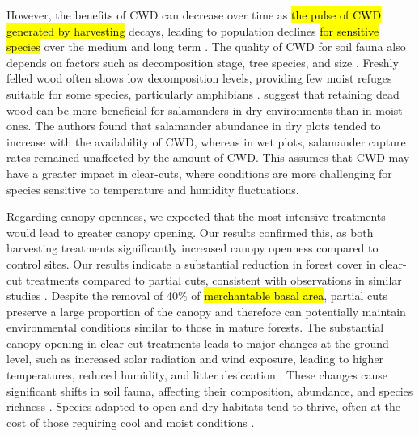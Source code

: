 However, the benefits of CWD can decrease over time as \hl{the pulse of CWD generated by harvesting} decays, leading to population declines \hl{for sensitive species} over the medium and long term \citep{Ochs2022Responseterrestrial}. 
The quality of CWD for soil fauna also depends on factors such as decomposition stage, tree species, and size \citep{Bunnell2010woodbiodiversity}. 
Freshly felled wood often shows low decomposition levels, providing few moist refuges suitable for some species, particularly amphibians \citep{Petranka1994Effectstimber,Morneault2004effectshelterwood,Owens2008Amphibianreptile,Otto2013Amphibianresponse}. 
\cite{Petranka1994Effectstimber} suggest that retaining dead wood can be more beneficial for salamanders in dry environments than in moist ones. 
The authors found that salamander abundance in dry plots tended to increase with the availability of CWD, whereas in wet plots, salamander capture rates remained unaffected by the amount of CWD. 
This assumes that CWD may have a greater impact in clear-cuts, where conditions are more challenging for species sensitive to temperature and humidity fluctuations.
 
Regarding canopy openness, we expected that the most intensive treatments would lead to greater canopy opening. 
Our results confirmed this, as both harvesting treatments significantly increased canopy openness compared to control sites. 
Our results indicate a substantial reduction in forest cover in clear-cut treatments compared to partial cuts, consistent with observations in similar studies \citep{Nolet2018Comparingeffects,Mazerolle2021Woodlandsalamander}. 
Despite the removal of 40\% of \hl{merchantable basal area}, partial cuts preserve a large proportion of the canopy and therefore can potentially maintain environmental conditions similar to those in mature forests. 
The substantial canopy opening in clear-cut treatments leads to major changes at the ground level, such as increased solar radiation and wind exposure, leading to higher temperatures, reduced humidity, and litter desiccation \citep{Keenan1993ecologicaleffects,Chen1999MicroclimateForest,Lindo2003Microbialbiomass,Brooks2008Forestfloor,Dumais2025Translocatedsouthern}. 
These changes cause significant shifts in soil fauna, affecting their composition, abundance, and species richness \citep{Staab2023Insectdecline}. 
Species adapted to open and dry habitats tend to thrive, often at the cost of those requiring cool and moist conditions \citep{Niemela2007effectsforestry,Ochs2022Responseterrestrial,Staab2023Insectdecline}.

